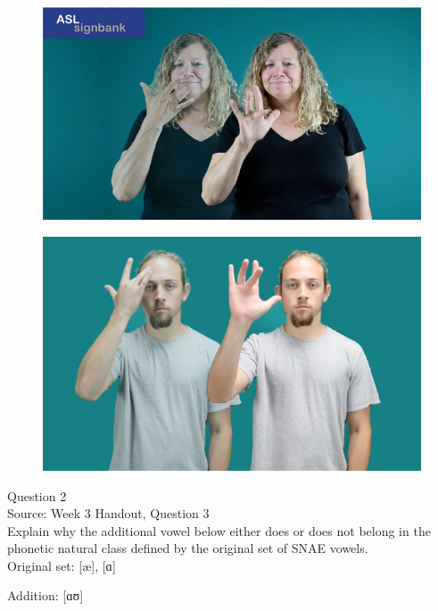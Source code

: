 \documentclass[12pt]{article}
\begin{document}
\begin{figure}[H]
\includegraphics{../images/asl_lucky.png}
\end{figure}
\begin{figure}[H]
\includegraphics{../images/asl_smart.png}
\end{figure}

\newpage

{\large Question 2}\\

Source: Week 3 Handout, Question 3\\

Explain why the additional vowel below either does or does not belong in the phonetic natural class defined by the original set of SNAE vowels.\\

Original set: {[æ]}, {[ɑ]}

Addition: {[ɑʊ]}


\newpage

\begin{center}
\textbf{{\color{red}{\HUGE END OF EXAM}}}\\

\end{center}
\newpage
\end{document}
